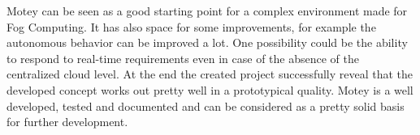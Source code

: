 Motey can be seen as a good starting point for a complex environment made for Fog Computing.
It has also space for some improvements, for example the autonomous behavior can be improved a lot.
One possibility could be the ability to respond to real-time requirements even in case of the absence of the centralized cloud level.
At the end the created project successfully reveal that the developed concept works out pretty well in a prototypical quality.
Motey is a well developed, tested and documented and can be considered as a pretty solid basis for further development.
